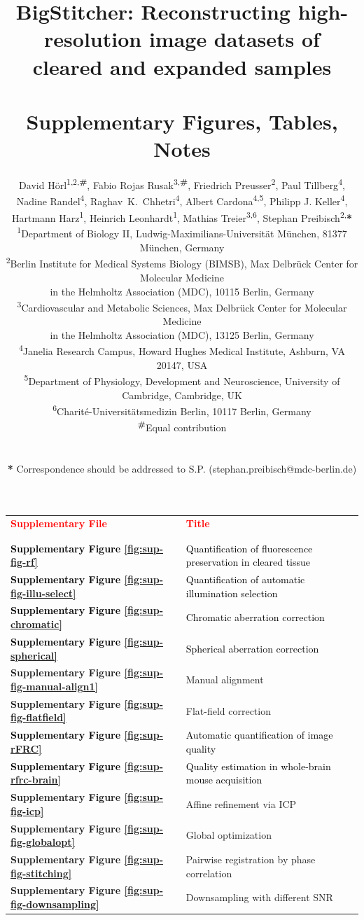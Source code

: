\documentclass[]{spie}  %
\title{BigStitcher: Reconstructing high-resolution image datasets of cleared and expanded samples \\~\\ \large{Supplementary Figures, Tables, Notes}}
\author{David H{\"o}rl\textsuperscript{1,2,\textbf{\#}}, Fabio Rojas Rusak\textsuperscript{3,\textbf{\#}}, Friedrich Preusser\textsuperscript{2}, Paul Tillberg\textsuperscript{4}, Nadine Randel\textsuperscript{4}, Raghav~K.~Chhetri\textsuperscript{4}, Albert Cardona\textsuperscript{4,5}, Philipp J. Keller\textsuperscript{4}, Hartmann Harz\textsuperscript{1}, Heinrich Leonhardt\textsuperscript{1}, Mathias Treier\textsuperscript{3,6}, Stephan Preibisch\textsuperscript{2,}\textbf{*}
\skiplinehalf
\small{
\textsuperscript{1}Department of Biology II, Ludwig-Maximilians-Universität München, 81377 München, Germany \\
\textsuperscript{2}Berlin Institute for Medical Systems Biology (BIMSB), Max Delbrück Center for Molecular Medicine \\in the Helmholtz Association (MDC), 10115 Berlin, Germany \\
\textsuperscript{3}Cardiovascular and Metabolic Sciences, Max Delbrück Center for Molecular Medicine\\ in the Helmholtz Association (MDC), 13125 Berlin, Germany \\
\textsuperscript{4}Janelia Research Campus, Howard Hughes Medical Institute, Ashburn, VA 20147, USA \\
\textsuperscript{5}Department of Physiology, Development and Neuroscience, University of Cambridge, Cambridge, UK \\
\textsuperscript{6}Charité-Universitätsmedizin Berlin, 10117 Berlin, Germany\\
\textsuperscript{\textbf{\#}}Equal contribution
}
\normalsize
{
\\~\\~\\
\textbf{*} Correspondence should be addressed to S.P. (stephan.preibisch@mdc-berlin.de)
}
}
\def\red{\textcolor{black}}
\newcommand\tablespace{\vspace{2.5mm}}
\begin{document}
\maketitle

\setcounter{page}{1}


\hspace{5mm}

\begin{table}[h!]
\center
{
\fontsize{12pt}{11pt}\selectfont
\center
\begin{tabular}{lp{11cm}}
\textbf{\textcolor{red}{Supplementary File}} & \textbf{\textcolor{red}{Title}}\\ \\
\hline
\\
\textbf{\red{Supplementary Figure \ref{fig:sup-fig-rf}}} & \red{Quantification of fluorescence preservation in cleared tissue}\tablespace \\
\textbf{\red{Supplementary Figure \ref{fig:sup-fig-illu-select}}} & \red{Quantification of automatic illumination selection} \tablespace \\
\textbf{\red{Supplementary Figure \ref{fig:sup-chromatic}}} & \red{Chromatic aberration correction}\tablespace \\
\textbf{\red{Supplementary Figure \ref{fig:sup-spherical}}} & \red{Spherical aberration correction}\tablespace \\
\textbf{Supplementary Figure \ref{fig:sup-fig-manual-align1}} &  Manual alignment \tablespace \\
\textbf{Supplementary Figure \ref{fig:sup-fig-flatfield}} & Flat-field correction \tablespace \\
\textbf{\red{Supplementary Figure \ref{fig:sup-rFRC}}} & \red{Automatic quantification of image quality}\tablespace \\
\textbf{\red{Supplementary Figure \ref{fig:sup-rfrc-brain}}} & \red{Quality estimation in whole-brain mouse acquisition}\tablespace \\
\textbf{Supplementary Figure \ref{fig:sup-fig-icp}} & Affine refinement via ICP \tablespace \\
\textbf{Supplementary Figure \ref{fig:sup-fig-globalopt}} & Global optimization \tablespace \\
\textbf{Supplementary Figure \ref{fig:sup-fig-stitching}} & Pairwise registration by phase correlation \tablespace \\
\textbf{Supplementary Figure \ref{fig:sup-fig-downsampling}} & Downsampling with different SNR \tablespace \\

\end{tabular}}
\end{table}
\end{document}
